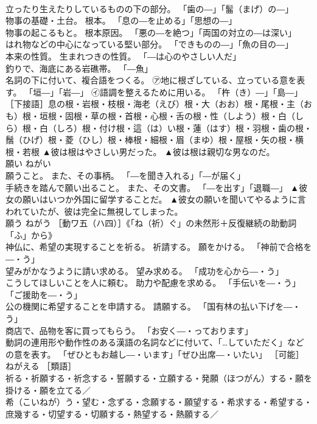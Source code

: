 \documentclass[8pt]{extreport}
\begin{document}
\begin{CJK}{UTF8}{min}
\\	立ったり生えたりしているものの下の部分。 「歯の―」「髷（まげ）の―」 
\\	物事の基礎・土台。 根本。 「息の―を止める」「思想の―」 
\\	物事の起こるもと。 根本原因。 「悪の―を絶つ」「両国の対立の―は深い」 
\\	はれ物などの中心になっている堅い部分。 「できものの―」「魚の目の―」 
\\	本来の性質。 生まれつきの性質。 「―は心のやさしい人だ」 
\\	釣りで、海底にある岩礁帯。 「―魚」 
\\	名詞の下に付いて、複合語をつくる。 ㋐地に根ざしている、立っている意を表す。 「垣―」「岩―」 ㋑語調を整えるために用いる。 「杵（き）―」「島―」 ［下接語］息の根・岩根・枝根・海老（えび）根・大（おお）根・尾根・主（おも）根・垣根・固根・草の根・首根・心根・舌の根・性（しよう）根・白（しら）根・白（しろ）根・付け根・這（は）い根・蓮（はす）根・羽根・歯の根・鬚（ひげ）根・菱（ひし）根・棒根・細根・眉（まゆ）根・屋根・矢の根・横根・若根	▲彼は根はやさしい男だった。 ▲彼は根は親切な男なのだ。
\\	願い	ねがい	
\\	願うこと。 また、その事柄。 「―を聞き入れる」「―が届く」 
\\	手続きを踏んで願い出ること。 また、その文書。 「―を出す」「退職―」	▲彼女の願いはいつか外国に留学することだ。 ▲彼女の願いを聞いてやるように言われていたが、彼は完全に無視してしまった。
\\	願う	ねがう	［動ワ五（ハ四）］《「ね（祈）ぐ」の未然形＋反復継続の助動詞「ふ」から》 
\\	神仏に、希望の実現することを祈る。 祈請する。 願をかける。 「神前で合格を―・う」 
\\	望みがかなうように請い求める。 望み求める。 「成功を心から―・う」 
\\	こうしてほしいことを人に頼む。 助力や配慮を求める。 「手伝いを―・う」「ご援助を―・う」 
\\	公の機関に希望することを申請する。 請願する。 「国有林の払い下げを―・う」 
\\	商店で、品物を客に買ってもらう。 「お安く―・っております」 
\\	動詞の連用形や動作性のある漢語の名詞などに付いて、「…していただく」などの意を表す。 「ぜひともお越し―・います」「ぜひ出席―・いたい」 ［可能］ねがえる ［類語］
\\	祈る・祈願する・祈念する・誓願する・立願する・発願（ほつがん）する・願を掛ける・願を立てる／
\\	希（こいねが）う・望む・念ずる・念願する・願望する・希求する・希望する・庶幾する・切望する・切願する・熱望する・熱願する／

\end{CJK}
\end{document}
